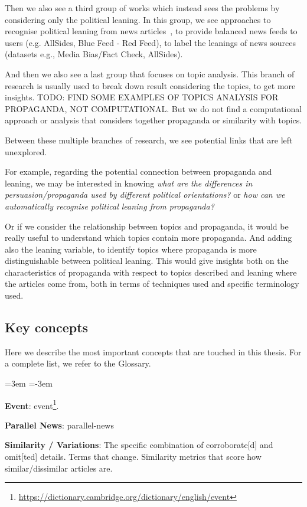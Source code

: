 Then we also see a third group of works which instead sees the problems by considering only the political leaning. In this group, we see approaches to recognise political leaning from news articles~\citep{baly2020we}, to provide balanced news feeds to users (e.g. AllSides, Blue Feed - Red Feed), to label the leanings of news sources (datasets e.g., Media Bias/Fact Check, AllSides).

And then we also see a last group that focuses on topic analysis. This branch of research is usually used to break down result considering the topics, to get more insights.
TODO: FIND SOME EXAMPLES OF TOPICS ANALYSIS FOR PROPAGANDA, NOT COMPUTATIONAL.
But we do not find a computational approach or analysis that considers together propaganda or similarity with topics.


Between these multiple branches of research, we see potential links that are left unexplored.

For example, regarding the potential connection between propaganda and leaning, we may be interested in knowing \emph{what are the differences in persuasion/propaganda used by different political orientations?} or \emph{how can we automatically recognise political leaning from propaganda?}

Or if we consider the relationship between topics and propaganda, it would be really useful to understand which topics contain more propaganda. And adding also the leaning variable, to identify topics where propaganda is more distinguishable between political leaning. This would give insights both on the characteristics of propaganda with respect to topics described and leaning where the articles come from, both in terms of techniques used and specific terminology used. 

\subsection{Key concepts}

Here we describe the most important concepts that are touched in this thesis. For a complete list, we refer to the Glossary.

\leftskip=3em
\parindent=-3em

\textbf{Event}: \glsdesc*{event}\footnote{\url{https://dictionary.cambridge.org/dictionary/english/event}}.

\textbf{Parallel News}: \glsdesc*{parallel-news}

\textbf{Similarity / Variations}: The specific combination of \gls{corroborate}[d] and \gls{omit}[ted] details. Terms that change. Similarity metrics that score how similar/dissimilar articles are.

